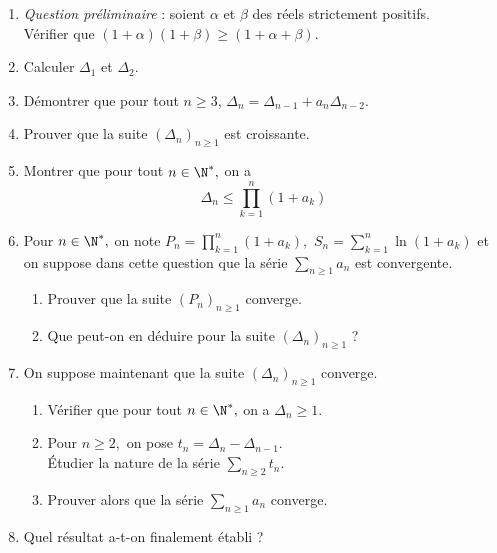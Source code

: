 \documentclass[twoside,french,11pt]{VcCours}
\begin{document}
\begin{enumerate}
	\item \textit{Question préliminaire} : soient $\alpha$ et $\beta$ des réels strictement positifs.\\ 
	Vérifier que $(1+\alpha)(1+\beta)\geq(1+\alpha+\beta).$ 
	\item Calculer $\Delta_1$ et $\Delta_2.$
	\item Démontrer que pour tout $n\geq 3$, $\Delta_n=\Delta_{n-1}+a_n\Delta_{n-2}.$ 
	\item Prouver que la suite $(\Delta_n)_{n \geq 1}$ est croissante.
	\item Montrer que pour tout $n\in\N^*,$ on a $$\Delta_n\leq \prod_{k=1}^n(1+a_k)$$
  \item Pour $n\in\N^*,$ on note $P_n=	\prod_{k=1}^n(1+a_k),$ $S_n=\sum_{k=1}^n\ln(1+a_k)$ et on suppose dans cette question que la série $\sum_{n\geq 1} a_n$ est convergente.
  \begin{enumerate}
    \item Prouver que la suite $(P_n)_{n \geq 1}$ converge.
    \item Que peut-on en déduire pour la suite $(\Delta_n)_{n \geq 1}$ ?
  \end{enumerate}
	\item On suppose maintenant que la suite $(\Delta_n)_{n \geq 1}$ converge.
  \begin{enumerate}
	  \item Vérifier que pour tout $n\in\N^*,$ on a $\Delta_n\geq 1.$
		\item Pour $n\geq 2, $ on pose $t_n=\Delta_n-\Delta_{n-1}.$\\
		Étudier la nature de la série $\sum_{n\geq 2} t_n.$
		\item Prouver alors que la série $\sum_{n\geq 1}a_n$ converge.
  \end{enumerate}
	\item Quel résultat a-t-on finalement établi ?
\end{enumerate}
\end{document}
